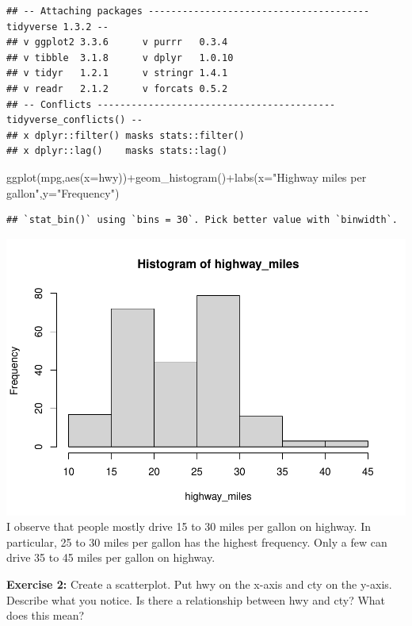 \documentclass[
]{article}
\newenvironment{Shaded}{\begin{snugshade}}{\end{snugshade}}
\newcommand{\AttributeTok}[1]{\textcolor[rgb]{0.77,0.63,0.00}{#1}}
\newcommand{\FunctionTok}[1]{\textcolor[rgb]{0.00,0.00,0.00}{#1}}
\newcommand{\NormalTok}[1]{#1}
\newcommand{\SpecialCharTok}[1]{\textcolor[rgb]{0.00,0.00,0.00}{#1}}
\newcommand{\StringTok}[1]{\textcolor[rgb]{0.31,0.60,0.02}{#1}}
\begin{document}
\begin{verbatim}
## -- Attaching packages --------------------------------------- tidyverse 1.3.2 --
## v ggplot2 3.3.6      v purrr   0.3.4 
## v tibble  3.1.8      v dplyr   1.0.10
## v tidyr   1.2.1      v stringr 1.4.1 
## v readr   2.1.2      v forcats 0.5.2 
## -- Conflicts ------------------------------------------ tidyverse_conflicts() --
## x dplyr::filter() masks stats::filter()
## x dplyr::lag()    masks stats::lag()
\end{verbatim}

\begin{Shaded}
\begin{Highlighting}[]
\FunctionTok{ggplot}\NormalTok{(mpg,}\FunctionTok{aes}\NormalTok{(}\AttributeTok{x=}\NormalTok{hwy))}\SpecialCharTok{+}\FunctionTok{geom\_histogram}\NormalTok{()}\SpecialCharTok{+}\FunctionTok{labs}\NormalTok{(}\AttributeTok{x=}\StringTok{"Highway miles per gallon"}\NormalTok{,}\AttributeTok{y=}\StringTok{"Frequency"}\NormalTok{)}
\end{Highlighting}
\end{Shaded}

\begin{verbatim}
## `stat_bin()` using `bins = 30`. Pick better value with `binwidth`.
\end{verbatim}

\includegraphics{PSTAT131-HW1_files/figure-latex/unnamed-chunk-1-1.pdf}
I observe that people mostly drive 15 to 30 miles per gallon on highway.
In particular, 25 to 30 miles per gallon has the highest frequency. Only
a few can drive 35 to 45 miles per gallon on highway.

\textbf{Exercise 2:} Create a scatterplot. Put hwy on the x-axis and cty
on the y-axis. Describe what you notice. Is there a relationship between
hwy and cty? What does this mean?
\end{document}
